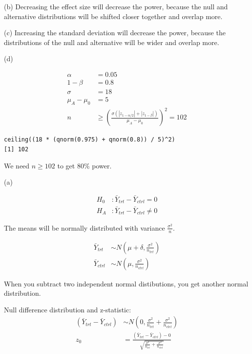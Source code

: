\documentclass[11pt]{article}
\begin{document}
\noindent (b) Decreasing the effect size will decrease the power, because the null and alternative distributions will be shifted closer together and overlap more.

\vspace{0.1in}

\noindent(c) Increasing the standard deviation will decrease the power, because the distributions of the null and alternative will be wider and overlap more.

\vspace{0.1in}

\noindent (d)

\begin{align*}
\alpha &= 0.05\\
1 - \beta &= 0.8\\
\sigma &= 18\\
\mu_A - \mu_0 &= 5\\
n &\ge \left(\frac{\sigma (|z_{1-\alpha/2}| + |z_{1-\beta}|)}{\mu_A - \mu_0} \right)^2 = 102
\end{align*}

\begin{verbatim}
ceiling((18 * (qnorm(0.975) + qnorm(0.8)) / 5)^2)
[1] 102
\end{verbatim}

We need $n \ge 102$ to get 80\% power.

\vspace{0.3in}



\vspace{0.1in}

\noindent (a)

\begin{align*}
H_0&: \bar{Y}_{trt} - \bar{Y}_{ctrl} = 0\\
H_A&: \bar{Y}_{trt} - \bar{Y}_{ctrl} \ne 0
\end{align*}

The means will be normally distributed with variance $\frac{\sigma^2}{n}$.

\begin{align*}
\bar{Y}_{trt} &\sim N(\mu+\delta,\frac{\sigma^2}{n_{trt}})\\
\bar{Y}_{ctrl} &\sim N(\mu,\frac{\sigma^2}{n_{ctrl}})
\end{align*}

When you subtract two independent normal distibutions, you get another normal distribution.

Null difference distribution and z-statistic:
\begin{align*}
(\bar{Y}_{trt} - \bar{Y}_{ctrl}) &\sim N(0, \frac{\sigma^2}{n_{trt}} + \frac{\sigma^2}{n_{ctrl}})\\
z_0 &= \frac{(\bar{Y}_{trt} - \bar{Y}_{ctrl}) - 0}{\sqrt{\frac{\sigma^2}{n_{trt}} + \frac{\sigma^2}{n_{ctrl}}}}
\end{align*}
\end{document}
